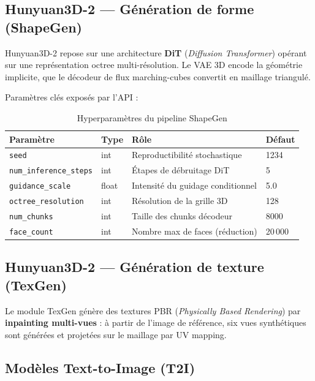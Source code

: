 \documentclass[12pt,a4paper,oneside]{report}
\begin{document}
\subsection{Hunyuan3D-2 — Génération de forme (ShapeGen)}

Hunyuan3D-2 \cite{hunyuan3d2024} repose sur une architecture
\textbf{DiT} (\textit{Diffusion Transformer}) opérant sur une représentation
octree multi-résolution. Le VAE 3D encode la géométrie implicite, que le
décodeur de flux marching-cubes convertit en maillage triangulé.

Paramètres clés exposés par l'API :

\begin{table}[H]
\centering
\caption{Hyperparamètres du pipeline ShapeGen}
\label{tab:hyper}
\begin{tabularx}{\linewidth}{@{}llXl@{}}
\toprule
\textbf{Paramètre} & \textbf{Type} & \textbf{Rôle} & \textbf{Défaut} \\
\midrule
\texttt{seed}                  & int   & Reproductibilité stochastique    & 1234 \\
\texttt{num\_inference\_steps} & int   & Étapes de débruitage DiT         & 5 \\
\texttt{guidance\_scale}       & float & Intensité du guidage conditionnel & 5.0 \\
\texttt{octree\_resolution}    & int   & Résolution de la grille 3D       & 128 \\
\texttt{num\_chunks}           & int   & Taille des chunks décodeur       & 8000 \\
\texttt{face\_count}           & int   & Nombre max de faces (réduction)  & 20\,000 \\
\bottomrule
\end{tabularx}
\end{table}

\subsection{Hunyuan3D-2 — Génération de texture (TexGen)}

Le module TexGen génère des textures PBR (\textit{Physically Based Rendering})
par \textbf{inpainting multi-vues} : à partir de l'image de référence, six
vues synthétiques sont générées et projetées sur le maillage par UV mapping.

\subsection{Modèles Text-to-Image (T2I)}
\end{document}
